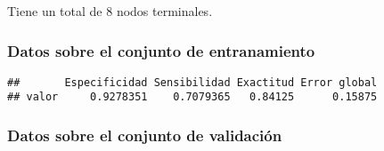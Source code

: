 \documentclass[
]{article}
\newenvironment{Shaded}{\begin{snugshade}}{\end{snugshade}}
\newcommand{\AttributeTok}[1]{\textcolor[rgb]{0.77,0.63,0.00}{#1}}
\newcommand{\FunctionTok}[1]{\textcolor[rgb]{0.00,0.00,0.00}{#1}}
\newcommand{\NormalTok}[1]{#1}
\newcommand{\OtherTok}[1]{\textcolor[rgb]{0.56,0.35,0.01}{#1}}
\newcommand{\SpecialCharTok}[1]{\textcolor[rgb]{0.00,0.00,0.00}{#1}}
\newcommand{\StringTok}[1]{\textcolor[rgb]{0.31,0.60,0.02}{#1}}
\begin{document}
Tiene un total de 8 nodos terminales.

\hypertarget{datos-sobre-el-conjunto-de-entranamiento}{%
\subsubsection{Datos sobre el conjunto de
entranamiento}\label{datos-sobre-el-conjunto-de-entranamiento}}

\begin{Shaded}
\end{Shaded}

\begin{verbatim}
##       Especificidad Sensibilidad Exactitud Error global
## valor     0.9278351    0.7079365   0.84125      0.15875
\end{verbatim}

\hypertarget{datos-sobre-el-conjunto-de-validaciuxf3n}{%
\subsubsection{Datos sobre el conjunto de
validación}\label{datos-sobre-el-conjunto-de-validaciuxf3n}}

\begin{Shaded}
\end{Shaded}
\end{document}
